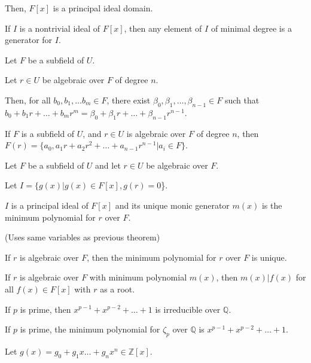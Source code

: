 \documentclass{article}
\newcommand{\Z}{\mathbb Z}
\newcommand{\Q}{\mathbb Q}
\begin{document}
Then, $F[x]$ is a principal ideal domain.


If $I$ is a nontrivial ideal of $F[x]$, then any element of $I$ of minimal degree is a generator for $I$.

\newpage


Let $F$ be a subfield of $U$.

Let $r\in U$ be algebraic over $F$ of degree $n$.

Then, for all $b_0, b_1, \hdots b_m \in F$, there exist $\beta_0, \beta_1, \hdots, \beta_{n-1}\in F$ such that $b_0 + b_1r + \hdots + b_mr^m = \beta_0 + \beta_1r + \hdots + \beta_{n-1}r^{n-1}$.


If $F$ is a subfield of $U$, and $r\in U$ is algebraic over $F$ of degree $n$, then $F(r) = \{a_0, a_1r + a_2r^2 + \hdots + a_{n-1}r^{n-1} | a_i\in F\}$.


Let $F$ be a subfield of $U$ and let $r\in U$ be algebraic over $F$.

Let $I = \{g(x)| g(x)\in F[x], g(r)=0$\}.

$I$ is a principal ideal of $F[x]$ and its unique monic generator $m(x)$ is the minimum polynomial for $r$ over $F$.

(Uses same variables as previous theorem)

If $r$ is algebraic over $F$, then the minimum polynomial for $r$ over $F$ is unique.


If $r$ is algebraic over $F$ with minimum polynomial $m(x)$, then $m(x)|f(x)$ for all $f(x)\in F[x]$ with $r$ as a root. 

\newpage


If $p$ is prime, then $x^{p-1} + x^{p-2} + \hdots + 1$ is irreducible over $\Q$.


If $p$ is prime, the minimum polynomial for $\zeta_p$ over $\Q$ is  $x^{p-1} + x^{p-2} + \hdots + 1$.


Let $g(x)=g_0+g_1x\hdots+g_nx^n\in\Z[x]$.
\end{document}
